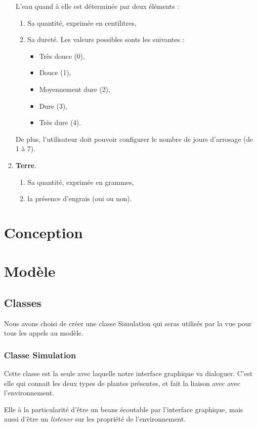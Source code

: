 \documentclass[a4paper,10pt]{article}
\begin{document}
\begin{enumerate}
L'eau quand à elle est déterminée par deux éléments :
\begin{enumerate}
	\item Sa quantité, exprimée en centilitres,
	\item Sa dureté. Les valeurs possibles sonts les suivantes :
		\begin{itemize}
			\item Très douce (0),
			\item Douce (1),
			\item Moyennement dure (2),
			\item Dure (3),
			\item Très dure (4).
		\end{itemize}
	\end{enumerate}
De plus, l'utilisateur doit pouvoir configurer le nombre de jours d'arrosage (de 1 à 7).

 \item \textbf{Terre}.
	\begin{enumerate}
	\item Sa quantité, exprimée en grammes,
	\item la présence d'engrais (oui ou non).
	\end{enumerate}
\end{enumerate}


\section{Conception}
\section{Modèle}
\subsection{Classes}
Nous avons choisi de créer une classe Simulation qui seras utilisés par la vue pour tous les appels au modèle.
\subsubsection{Classe Simulation}
Cette classe est la seule avec laquelle notre interface graphique va dialoguer.
C'est elle qui connait les deux types de plantes présentes, et fait la liaison avec avec l'environnement.

Elle à la particularité d'être un beans écoutable par l'interface graphique, mais aussi d'être un \textit{listener} 
sur les propriété de l'environnement.
\end{document}
